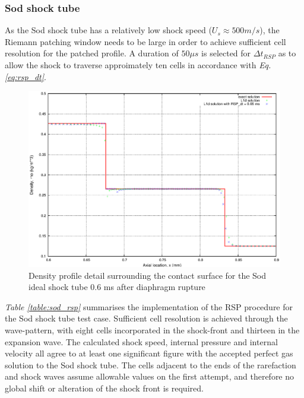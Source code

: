 \documentclass[a4paper,10pt]{article}
\begin{document}
\subsubsection{Sod shock tube}

As the Sod shock tube has a relatively low shock speed ($U_{s} \approx 500 m/s$), the Riemann patching window needs to be large in order to achieve sufficient cell resolution for the patched profile.  A duration of $50 \mu s$ is selected for $\Delta t_{RSP}$ as to allow the shock to traverse approimately ten cells in accordance with \emph{Eq. \ref{eq:rsp_dt}}.

\begin{figure}[h]
\centering
\includegraphics[scale=0.9]{figs/sod_density_detail.eps}
\caption{Density profile detail surrounding the contact surface for the Sod ideal shock tube 0.6 ms after diaphragm rupture}
\label{fig:sod_density} %
\end{figure}

\par \medskip

\emph{Table \ref{table:sod_rsp}} summarises the implementation of the RSP procedure for the Sod shock tube test case.  Sufficient cell resolution is achieved through the wave-pattern, with eight cells incorporated in the shock-front and thirteen in the expansion wave.  The calculated shock speed, internal pressure and internal velocity all agree to at least one significant figure with the accepted perfect gas solution to the Sod shock tube.  The cells adjacent to the ends of the rarefaction and shock waves assume allowable values on the first attempt, and therefore no global shift or alteration of the shock front is required.
\end{document}
